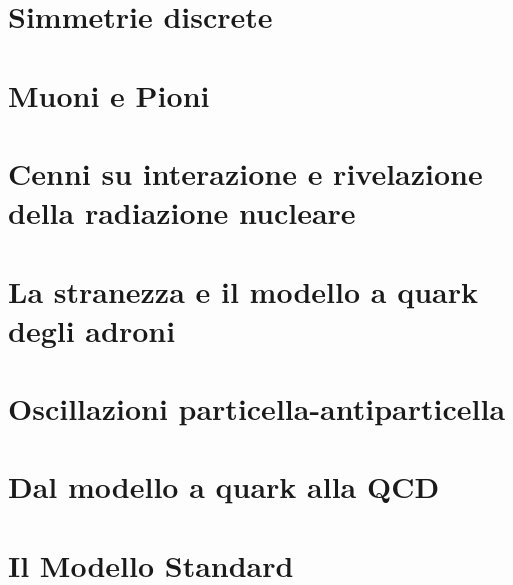 \documentclass[11pt]{article}
\begin{document}
\section{Simmetrie discrete}

\section{Muoni e Pioni}

\section{Cenni su interazione e rivelazione della radiazione nucleare}

\section{La stranezza e il modello a quark degli adroni}

\section{Oscillazioni particella-antiparticella}

\section{Dal modello a quark alla QCD}

\section{Il Modello Standard}

\end{document}
